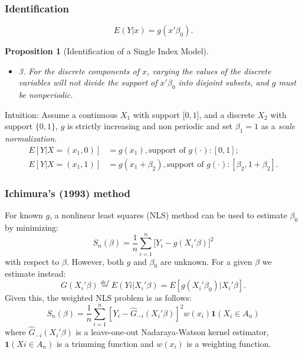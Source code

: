 \documentclass{beamer}
\begin{document}

\begin{frame}[t]
    \frametitle{Identification}
     \begin{equation*}
		E(Y|x) = g(x'\beta_0).
	  \end{equation*}
    \newtheorem{prop3}{Proposition}[section]   
	  \begin{prop3}[Identification of a Single Index Model] 
		\begin{itemize}
        \item 3. For the discrete components of $x$, varying the values of the discrete variables will not divide the support of $x'\beta_0$ into disjoint subsets, and $g$ must be nonperiodic.
		\end{itemize}
    \end{prop3}
    Intuition:
Assume a continuous $X_1$ with support $\big[0,1\big]$, and a discrete $X_2$ with support $\{0,1\}$, $g$ is strictly increasing and non periodic and set $\beta_1 = 1$ as a \textit{scale normalization}.
    \[
\begin{split}
E[Y| X = (x_1,0)]& = g(x_1), \text{support\ of } g(\cdot): [0,1];  \\
E[Y| X = (x_1,1)]& = g(x_1+\beta_2), \text{support\ of } g(\cdot): [\beta_2,1+\beta_2].
\end{split}
\]

\note{~}
\end{frame}

\begin{frame}
\frametitle{Ichimura's (1993) method}
For known $g$, a nonlinear least squares (NLS) method can be used to estimate $\beta_0$ by minimizing:
\begin{equation}
S_n(\beta) = \frac{1}{n}\sum_{i = 1}^n\big[Y_i - g(X_i'\beta)\big]^2
\end{equation}
with respect to $\beta$. 
However, both $g$ and $\beta_0$ are unknown. For a given $\beta$ we estimate instead:
\begin{equation}
G(X_i'\beta) \stackrel{def}{=} E(Yi|X_i'\beta) = E[g(X_i'\beta_0)|X_i'\beta].
\end{equation}
Given this, the weighted NLS problem is as follows:
\begin{equation}
S_n(\beta) = \frac{1}{n} \sum_{i=1}^{n}  [Y_i - \hat{G}_{-i}(X_i'\beta)]^2w(x_i)\mathbf{1}{(X_i \in A_n)}
\end{equation}
where $\hat{G}_{-i}(X_i'\beta)$ is a leave-one-out Nadaraya-Watson kernel estimator,  $\mathbf{1}{(Xi \in A_n)}$ is a trimming function and $w(x_i)$ is a weighting function.
\end{frame}
\end{document}
